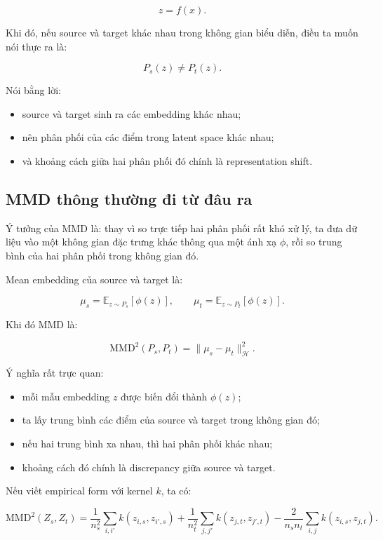 \documentclass[a4paper]{article}
\begin{document}
\[
z = f(x).
\]

Khi đó, nếu source và target khác nhau trong không gian biểu diễn, điều ta muốn nói thực ra là:

\[
P_s(z) \neq P_t(z).
\]

Nói bằng lời:

\begin{itemize}
    \item source và target sinh ra các embedding khác nhau;
    \item nên phân phối của các điểm trong latent space khác nhau;
    \item và khoảng cách giữa hai phân phối đó chính là representation shift.
\end{itemize}

\subsection{MMD thông thường đi từ đâu ra}

Ý tưởng của MMD là: thay vì so trực tiếp hai phân phối rất khó xử lý, ta đưa dữ liệu vào một không gian đặc trưng khác thông qua một ánh xạ $\phi$, rồi so trung bình của hai phân phối trong không gian đó.

Mean embedding của source và target là:

\[
\mu_s = \mathbb{E}_{z \sim P_s}[\phi(z)],
\qquad
\mu_t = \mathbb{E}_{z \sim P_t}[\phi(z)].
\]

Khi đó MMD là:

\[
\mathrm{MMD}^2(P_s, P_t) = \|\mu_s - \mu_t\|_{\mathcal H}^2.
\]

Ý nghĩa rất trực quan:

\begin{itemize}
    \item mỗi mẫu embedding $z$ được biến đổi thành $\phi(z)$;
    \item ta lấy trung bình các điểm của source và target trong không gian đó;
    \item nếu hai trung bình xa nhau, thì hai phân phối khác nhau;
    \item khoảng cách đó chính là discrepancy giữa source và target.
\end{itemize}

Nếu viết empirical form với kernel $k$, ta có:

\[
\mathrm{MMD}^2(Z_s,Z_t)
= \frac{1}{n_s^2}\sum_{i,i'} k(z_{i,s},z_{i',s})
+ \frac{1}{n_t^2}\sum_{j,j'} k(z_{j,t},z_{j',t})
- \frac{2}{n_sn_t}\sum_{i,j} k(z_{i,s},z_{j,t}).
\]
\end{document}
